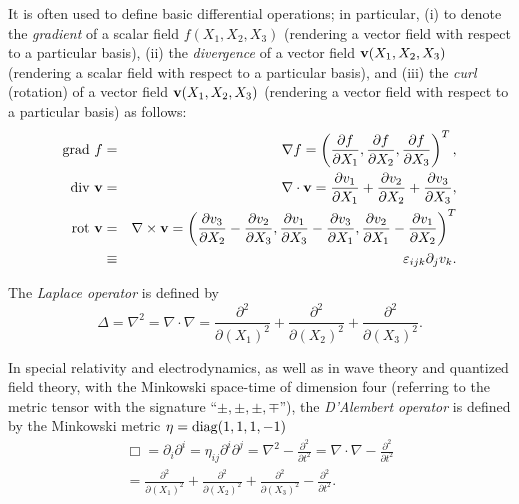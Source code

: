 It is often used to define basic differential operations;
in particular, (i) to denote the {\em gradient} of a scalar field $f(X_1,X_2,X_3)$ (rendering a vector field with respect to a particular basis),
(ii) the {\em divergence} of a vector field ${\bf v}(X_1,X_2,X_3)$
(rendering a scalar field with respect to a particular basis), and
(iii) the {\em curl} (rotation) of a vector field  ${\bf v}(X_1,X_2,X_3)$ (rendering a vector field with respect to a particular basis)
as follows:
\begin{eqnarray}
\textrm{grad } f &=& \nabla f = \left(
\frac{\partial f}{\partial X_1},
\frac{\partial f}{\partial X_2},
\frac{\partial f}{\partial X_3}
\right)^T  ,\\
\textrm{div }  {\bf v} &=& \nabla \cdot {\bf v} =
\frac{\partial v_1}{\partial X_1}+
\frac{\partial v_2}{\partial X_2}+
\frac{\partial v_3}{\partial X_3}
  ,\\
\textrm{rot } {\bf v} &=& \nabla \times {\bf v} = \left(
\frac{\partial v_3}{\partial X_2}-
\frac{\partial v_2}{\partial X_3}
,
\frac{\partial v_1}{\partial X_3}-
\frac{\partial v_3}{\partial X_1}
,
\frac{\partial v_2}{\partial X_1}-
\frac{\partial v_1}{\partial X_2}
\right)^T          \\
&\equiv& \varepsilon_{ijk} \partial_j v_k.
\end{eqnarray}

The {\em Laplace operator}
is defined by
\begin{equation}
\Delta = \nabla^2= \nabla \cdot \nabla =
\frac{\partial^2 }{\partial (X_1)^2}+
\frac{\partial^2 }{\partial (X_2)^2}+
\frac{\partial^2 }{\partial (X_3)^2}
.
\end{equation}

In special relativity and electrodynamics,  as well as in  wave theory and quantized field theory, with the Minkowski space-time
of dimension four
(referring to the metric tensor with the signature ``$\pm ,\pm ,\pm ,\mp$''),
the {\em D'Alembert operator}
is defined by the Minkowski metric $\eta = {\rm diag} (1,1,1,-1)$
\begin{equation}
\begin{split}
\Box  = \partial_i \partial^i
=
\eta_{ij}  \partial^i \partial^j=
\nabla^2- \frac{\partial^2 }{\partial t^2}=
\nabla \cdot \nabla - \frac{\partial^2 }{\partial t^2}\\
=
\frac{\partial^2 }{\partial (X_1)^2}+
\frac{\partial^2 }{\partial (X_2)^2}+
\frac{\partial^2 }{\partial (X_3)^2}- \frac{\partial^2 }{\partial t^2}
.
\end{split}
\end{equation}



